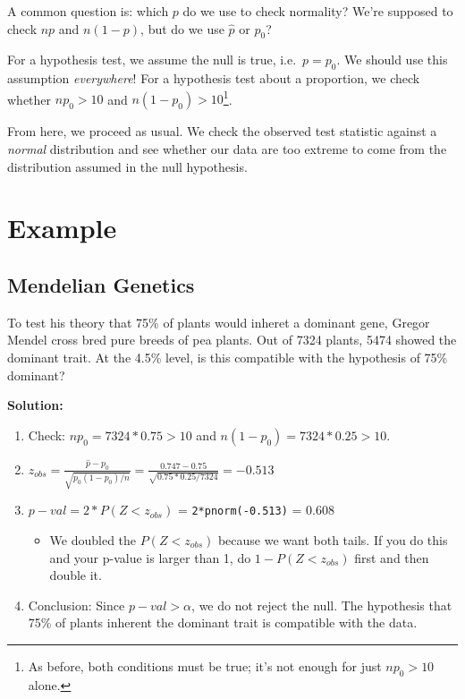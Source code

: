 \documentclass[
  letterpaper,
  DIV=11,
  numbers=noendperiod]{scrreprt}
\providecommand{\tightlist}{%
  \setlength{\itemsep}{0pt}\setlength{\parskip}{0pt}}\usepackage{longtable,booktabs,array}
\begin{document}
A common question is: which \(p\) do we use to check normality? We're
supposed to check \(np\) and \(n(1-p)\), but do we use \(\hat p\) or
\(p_0\)?

For a hypothesis test, we assume the null is true, i.e.~\(p=p_0\). We
should use this assumption \emph{everywhere}! For a hypothesis test
about a proportion, we check whether \(np_0>10\) and
\(n(1-p_0)>10\)\footnote{As before, both conditions must be true; it's
  not enough for just \(np_0>10\) alone.}.

From here, we proceed as usual. We check the observed test statistic
against a \emph{normal} distribution and see whether our data are too
extreme to come from the distribution assumed in the null hypothesis.

\hypertarget{example-3}{%
\section{Example}\label{example-3}}

\hypertarget{mendelian-genetics}{%
\subsection{Mendelian Genetics}\label{mendelian-genetics}}

To test his theory that 75\% of plants would inheret a dominant gene,
Gregor Mendel cross bred pure breeds of pea plants. Out of 7324 plants,
5474 showed the dominant trait. At the 4.5\% level, is this compatible
with the hypothesis of 75\% dominant?

\textbf{Solution:}

\begin{enumerate}
\def\labelenumi{\arabic{enumi}.}
\tightlist
\item
  Check: \(np_0 = 7324*0.75 > 10\) and \(n(1-p_0) = 7324*0.25 > 10\).
\item
  \(z_{obs} = \frac{\hat p - p_0}{\sqrt{p_0(1-p_0)/n}} = \frac{0.747 - 0.75}{\sqrt{0.75*0.25/7324}} = -0.513\)
\item
  \(p-val = 2 *P(Z < z_{obs})\) = \texttt{2*pnorm(-0.513)} = 0.608

  \begin{itemize}
  \tightlist
  \item
    We doubled the \(P(Z < z_{obs})\) because we want both tails. If you
    do this and your p-value is larger than 1, do \(1 - P(Z < z_{obs})\)
    first and then double it.
  \end{itemize}
\item
  Conclusion: Since \(p-val > \alpha\), we do not reject the null. The
  hypothesis that 75\% of plants inherent the dominant trait is
  compatible with the data.
\end{enumerate}
\end{document}
